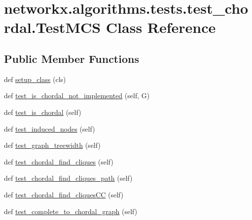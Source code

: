 \hypertarget{classnetworkx_1_1algorithms_1_1tests_1_1test__chordal_1_1TestMCS}{}\section{networkx.\+algorithms.\+tests.\+test\+\_\+chordal.\+Test\+M\+CS Class Reference}
\label{classnetworkx_1_1algorithms_1_1tests_1_1test__chordal_1_1TestMCS}
\subsection*{Public Member Functions}
\begin{DoxyCompactItemize}
\item 
def \hyperlink{classnetworkx_1_1algorithms_1_1tests_1_1test__chordal_1_1TestMCS_ac79396684ccec1d8c1bb649096c73f6b}{setup\+\_\+class} (cls)
\item 
def \hyperlink{classnetworkx_1_1algorithms_1_1tests_1_1test__chordal_1_1TestMCS_a3bdca14a684a669cf60bc532569ee635}{test\+\_\+is\+\_\+chordal\+\_\+not\+\_\+implemented} (self, G)
\item 
def \hyperlink{classnetworkx_1_1algorithms_1_1tests_1_1test__chordal_1_1TestMCS_acc7cff089c65e31ed326a49528bbfc99}{test\+\_\+is\+\_\+chordal} (self)
\item 
def \hyperlink{classnetworkx_1_1algorithms_1_1tests_1_1test__chordal_1_1TestMCS_a1b9754cd3dd2bf4ae4b81bc90fa50106}{test\+\_\+induced\+\_\+nodes} (self)
\item 
def \hyperlink{classnetworkx_1_1algorithms_1_1tests_1_1test__chordal_1_1TestMCS_aa587d1e7de8a5f16bc7e72843224ec34}{test\+\_\+graph\+\_\+treewidth} (self)
\item 
def \hyperlink{classnetworkx_1_1algorithms_1_1tests_1_1test__chordal_1_1TestMCS_aa60e4c3db13e195b3f326d60ecf113ff}{test\+\_\+chordal\+\_\+find\+\_\+cliques} (self)
\item 
def \hyperlink{classnetworkx_1_1algorithms_1_1tests_1_1test__chordal_1_1TestMCS_aa1232726a76630b4a13957837ec61ed5}{test\+\_\+chordal\+\_\+find\+\_\+cliques\+\_\+path} (self)
\item 
def \hyperlink{classnetworkx_1_1algorithms_1_1tests_1_1test__chordal_1_1TestMCS_a6d944f8fd0271be411784aede876e8c5}{test\+\_\+chordal\+\_\+find\+\_\+cliques\+CC} (self)
\item 
def \hyperlink{classnetworkx_1_1algorithms_1_1tests_1_1test__chordal_1_1TestMCS_ad9c8421ec1968da94cefd0776a23c23d}{test\+\_\+complete\+\_\+to\+\_\+chordal\+\_\+graph} (self)
\end{DoxyCompactItemize}
